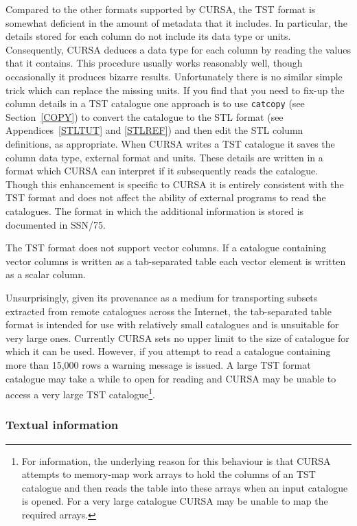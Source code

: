 \documentclass[twoside,11pt]{starlink}
\begin{document}
Compared to the other formats supported by CURSA, the TST format is
somewhat deficient in the amount of metadata that it includes.  In
particular, the details stored for each column do not include its data
type or units.  Consequently, CURSA deduces a data type for each column
by reading the values that it contains.  This procedure usually works
reasonably well, though occasionally it produces bizarre results.
Unfortunately there is no similar simple trick which can replace the
missing units.  If you find that you need to fix-up the column details in
a TST catalogue one approach is to use \texttt{catcopy} (see Section~\ref{COPY})
to convert the catalogue to the STL format (see Appendices~\ref{STLTUT}
and \ref{STLREF}) and then edit the STL column definitions, as appropriate.
When CURSA writes a TST catalogue it saves the column data type,
external format and units.  These details are written in a format which
CURSA can interpret if it subsequently reads the catalogue.  Though this
enhancement is specific to CURSA it is entirely consistent with the TST
format and does not affect the ability of external programs to read the
catalogues.  The format in which the additional information is stored is
documented in SSN/75.

The TST format does not support vector columns.  If a catalogue
containing vector columns is written as a tab-separated table each vector
element is written as a scalar column.

Unsurprisingly, given its provenance as a medium for transporting
subsets extracted from remote catalogues across the Internet, the
tab-separated table format is intended for use with relatively small
catalogues and is unsuitable for very large ones.  Currently CURSA sets no
upper limit to the size of catalogue for which it can be used.  However,
if you attempt to read a catalogue containing more than 15,000 rows a
warning message is issued.  A large TST format catalogue may take a while
to open for reading and CURSA may be unable to access a very large TST
catalogue\footnote{For information, the underlying reason for this
behaviour is that CURSA attempts to memory-map work arrays to hold the
columns of an TST catalogue and then reads the table into these arrays
when an input catalogue is opened.  For a very large catalogue CURSA may
be unable to map the required arrays.}.

\subsubsection{Textual information}
\end{document}
